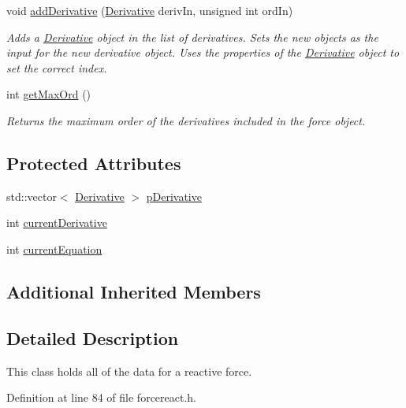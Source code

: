 \begin{DoxyCompactItemize}
void \hyperlink{classosea_1_1ofreq_1_1_force_react_a7f860f5726f2f9f9baba9775dc72f1ff}{add\-Derivative} (\hyperlink{classosea_1_1ofreq_1_1_derivative}{Derivative} deriv\-In, unsigned int ord\-In)
\begin{DoxyCompactList}\small\item\em Adds a \hyperlink{classosea_1_1ofreq_1_1_derivative}{Derivative} object in the list of derivatives. Sets the new objects as the input for the new derivative object. Uses the properties of the \hyperlink{classosea_1_1ofreq_1_1_derivative}{Derivative} object to set the correct index. \end{DoxyCompactList}\item 
int \hyperlink{classosea_1_1ofreq_1_1_force_react_ae11cdc98d818ca97f710ed13e584c53f}{get\-Max\-Ord} ()
\begin{DoxyCompactList}\small\item\em Returns the maximum order of the derivatives included in the force object. \end{DoxyCompactList}\end{DoxyCompactItemize}
\subsection*{Protected Attributes}
\begin{DoxyCompactItemize}
\item 
std\-::vector$<$ \hyperlink{classosea_1_1ofreq_1_1_derivative}{Derivative} $>$ \hyperlink{classosea_1_1ofreq_1_1_force_react_a28d2bfdc97809181be4d21713cc52181}{p\-Derivative}
\item 
int \hyperlink{classosea_1_1ofreq_1_1_force_react_a56c47ef95ad9ac1876b832dbf75297dd}{current\-Derivative}
\item 
int \hyperlink{classosea_1_1ofreq_1_1_force_react_a35b2a5464dd0135961e04a8389f5967f}{current\-Equation}
\end{DoxyCompactItemize}
\subsection*{Additional Inherited Members}


\subsection{Detailed Description}
This class holds all of the data for a reactive force. 

Definition at line 84 of file forcereact.\-h.



